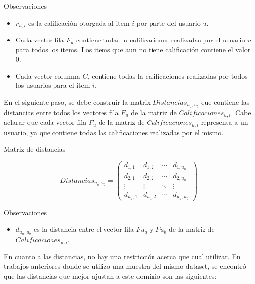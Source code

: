 \documentclass[11pt,a4paper,twoside]{thesis}
\begin{document}
\begin{description}
	\item[Observaciones]
\end{description}
\begin{itemize}
	\item $r_{u,i}$ es la calificación otorgada al item $i$ por parte del usuario $u$.
	\item Cada vector fila $F_u$ contiene todas la calificaciones realizadas por el usuario $u$ para todos los items. Los items que aun no tiene calificación contiene el valor 0.
	\item Cada vector columna $C_i$ contiene todas la calificaciones realizadas por todos los usuarios para el item $i$.
\end{itemize}


En el siguiente paso, se debe construir la matrix $Distancias_{u_a,u_b}$ que contiene las distancias entre todos los vectores fila $F_u$ de la matriz de $Calificaciones_{u,i}$.
Cabe aclarar que cada vector fila $F_u$ de la matriz de $Calificaciones_{u,i}$ representa a un usuario, ya que contiene todas las calificaciones realizadas por el mismo.


\begin{description}
	\item[Matriz de distancias]
\end{description}
\begin{equation*}
	Distancias_{u_a,u_b} =
	\begin{pmatrix}
	d_{1,1} & d_{1,2} & \cdots & d_{1,u_b} \\
	d_{2,1} & d_{2,2} & \cdots & d_{2,u_b} \\
	\vdots  & \vdots  & \ddots & \vdots  \\
	d_{u_a,1} & d_{u_a,2} & \cdots & d_{u_a,u_b} 
	\end{pmatrix}
\end{equation*}


\begin{description}
	\item[Observaciones]
\end{description}
\begin{itemize}
	\item $d_{u_a,u_b}$ es la distancia entre el vector fila $F{u_a}$ y $F{u_b}$ de la matriz de $Calificaciones_{u,i}$.
\end{itemize}


En cuanto a las distancias, no hay una restricción acerca que cual utilizar. En trabajos anteriores donde se utilizo una muestra del 
mismo dataset, se encontró que las distancias que mejor ajustan a este dominio son las siguientes:
\end{document}

